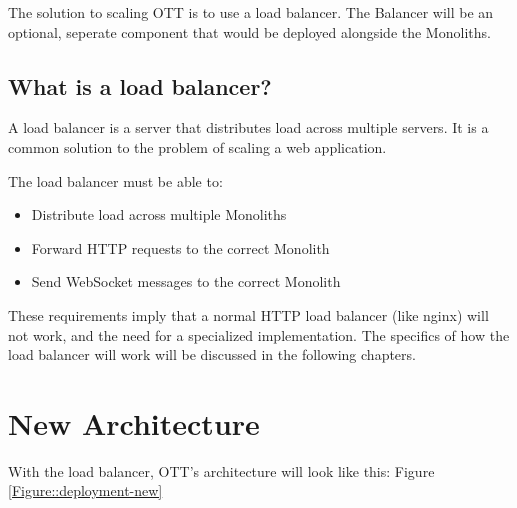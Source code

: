 The solution to scaling OTT is to use a load balancer. The Balancer will be an optional, seperate component that would be deployed alongside the Monoliths.

\subsection{What is a load balancer?}

A load balancer is a server that distributes load across multiple servers. It is a common solution to the problem of scaling a web application.

The load balancer must be able to:
\begin{itemize}
  \item Distribute load across multiple Monoliths
  \item Forward HTTP requests to the correct Monolith
  \item Send WebSocket messages to the correct Monolith
\end{itemize}

These requirements imply that a normal HTTP load balancer (like nginx) will not work, and the need for a specialized implementation. The specifics of how the load balancer will work will be discussed in the following chapters.

\section{New Architecture}

With the load balancer, OTT's architecture will look like this: Figure \ref{Figure::deployment-new}

